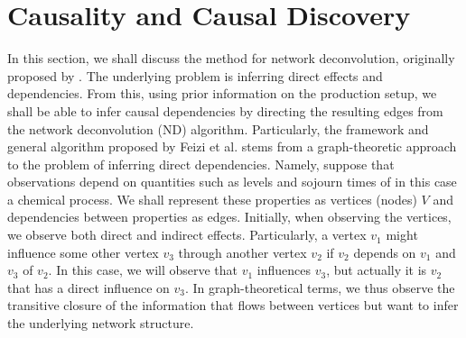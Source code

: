 \documentclass[../Thesis.tex]{subfiles}
\begin{document}
\section{Causality and Causal Discovery}
In this section, we shall discuss the method for network deconvolution, originally proposed by \cite{Network-deconvolution-as-a-general-method-to-distinguish-direct-dependencies-in-networks}. The underlying problem is inferring direct effects and dependencies. From this, using prior information on the production setup, we shall be able to infer causal dependencies by directing the resulting edges from the network deconvolution (ND) algorithm. Particularly, the framework and general algorithm proposed by Feizi et al. stems from a graph-theoretic approach to the problem of inferring direct dependencies. Namely, suppose that observations depend on quantities such as levels and sojourn times of in this case a chemical process. We shall represent these properties as vertices (nodes) $V$ and dependencies between properties as edges. Initially, when observing the vertices, we observe both direct and indirect effects. Particularly, a vertex $v_1$ might influence some other vertex $v_3$ through another vertex $v_2$ if $v_2$ depends on $v_1$ and $v_3$ of $v_2$. In this case, we will observe that $v_1$ influences $v_3$, but actually it is $v_2$ that has a direct influence on $v_3$. In graph-theoretical terms, we thus observe the transitive closure of the information that flows between vertices but want to infer the underlying network structure.
\end{document}

